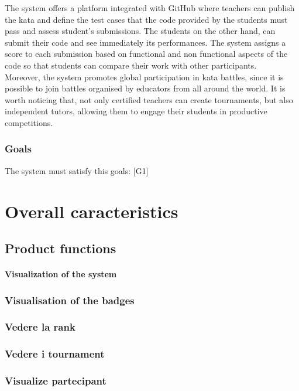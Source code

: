 \documentclass{article}
\begin{document}
        The system offers a platform integrated with GitHub where teachers can publish the kata and define the test cases that the code provided by the students must pass and assess student's submissions.
        The students on the other hand, can submit their code and see immediately
        its performances. The system assigns a score to each submission
        based on functional and non functional aspects of the code so that
        students can compare their work with other participants.\\
        
        Moreover, the system promotes global participation in kata battles, since it is possible to join battles organised by educators from all around the world.
        It is worth noticing that, not only certified teachers can create tournaments, but also independent tutors, allowing them to engage their students in productive competitions. 
        
            \subsubsection{Goals}
                The system must satisfy this goals:
                [G1] 

    \section{Overall caracteristics}
        \subsection{Product functions}
        \paragraph*{Visualization of the system}
            \subsubsection{Visualisation of the badges}
            \subsubsection{Vedere la rank}
            \subsubsection{Vedere i tournament}
            \subsubsection{Visualize partecipant}
        
\end{document}
